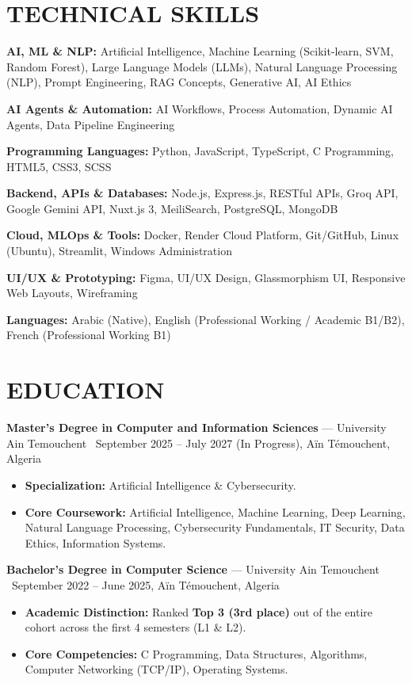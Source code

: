 \documentclass[10pt, letterpaper]{article}
\newcommand{\entry}[4]{%
  \noindent\textbf{#1} --- #3 \textbar\ #2, #4\par
  \vspace{2pt}
}
\newcommand{\resumeItem}[1]{\item #1}
\begin{document}
\section{TECHNICAL SKILLS}
\noindent\textbf{AI, ML \& NLP:} Artificial Intelligence, Machine Learning (Scikit-learn, SVM, Random Forest), Large Language Models (LLMs), Natural Language Processing (NLP), Prompt Engineering, RAG Concepts, Generative AI, AI Ethics\par
\noindent\textbf{AI Agents \& Automation:} AI Workflows, Process Automation, Dynamic AI Agents, Data Pipeline Engineering\par
\noindent\textbf{Programming Languages:} Python, JavaScript, TypeScript, C Programming, HTML5, CSS3, SCSS\par
\noindent\textbf{Backend, APIs \& Databases:} Node.js, Express.js, RESTful APIs, Groq API, Google Gemini API, Nuxt.js 3, MeiliSearch, PostgreSQL, MongoDB\par
\noindent\textbf{Cloud, MLOps \& Tools:} Docker, Render Cloud Platform, Git/GitHub, Linux (Ubuntu), Streamlit, Windows Administration\par
\noindent\textbf{UI/UX \& Prototyping:} Figma, UI/UX Design, Glassmorphism UI, Responsive Web Layouts, Wireframing\par
\noindent\textbf{Languages:} Arabic (Native), English (Professional Working / Academic B1/B2), French (Professional Working B1)

\section{EDUCATION}

\entry{Master's Degree in Computer and Information Sciences}{September 2025 -- July 2027 (In Progress)}{University Ain Temouchent}{Aïn Témouchent, Algeria}
\begin{itemize}
  \resumeItem{\textbf{Specialization:} Artificial Intelligence \& Cybersecurity.}
  \resumeItem{\textbf{Core Coursework:} Artificial Intelligence, Machine Learning, Deep Learning, Natural Language Processing, Cybersecurity Fundamentals, IT Security, Data Ethics, Information Systems.}
\end{itemize}

\entry{Bachelor's Degree in Computer Science}{September 2022 -- June 2025}{University Ain Temouchent}{Aïn Témouchent, Algeria}
\begin{itemize}
  \resumeItem{\textbf{Academic Distinction:} Ranked \textbf{Top 3 (3rd place)} out of the entire cohort across the first 4 semesters (L1 \& L2).}
  \resumeItem{\textbf{Core Competencies:} C Programming, Data Structures, Algorithms, Computer Networking (TCP/IP), Operating Systems.}
\end{itemize}
\end{document}
